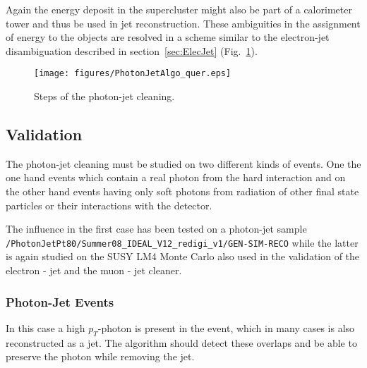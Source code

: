 \documentclass{cmspaper}
\begin{document}
Again the energy deposit in the supercluster might also be part of a
calorimeter tower and thus be used in jet reconstruction. These ambiguities in
the assignment of energy to the objects are resolved in a scheme similar to the
electron-jet disambiguation described in section~\ref{sec:ElecJet}
(Fig.~\ref{fig:PJCleaning}).


\begin{figure}[hbt]
\begin{center}
\texttt{[image: figures/PhotonJetAlgo\_quer.eps]}
\caption{Steps of the photon-jet cleaning.}
\label{fig:PJCleaning}
\end{center}
\end{figure}

\subsection{Validation}
The photon-jet cleaning must be studied on two different kinds of
events. One the one hand events which contain a real photon from the hard
interaction and on the other hand events having only soft photons from
radiation of other final state particles or their interactions with the detector.

The influence in the first case has been tested on a photon-jet sample
\newline\texttt{/PhotonJetPt80/Summer08\_IDEAL\_V12\_redigi\_v1/GEN-SIM-RECO} while
the latter is again studied on the SUSY LM4 Monte Carlo also used in the validation of the electron - jet and the muon - jet cleaner.

\subsubsection{Photon-Jet Events}
In this case a high $p_T$-photon is present in the event, which in many cases
is also reconstructed as a jet. The algorithm should detect these overlaps and
be able to preserve the photon while removing the jet.
\end{document}
